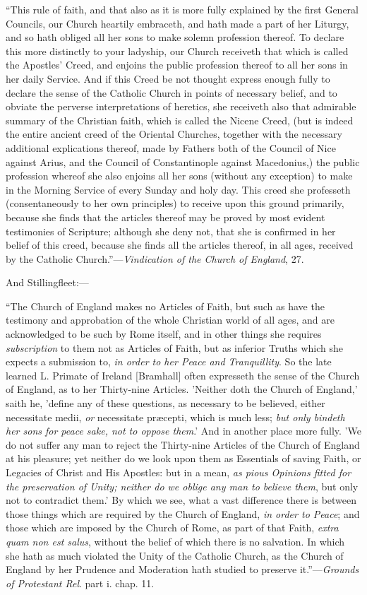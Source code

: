 ``This
rule of faith, and that also as it is more fully explained by the
first General Councils, our Church heartily embraceth, and hath made a
part of her Liturgy, and so hath obliged all her sons to make solemn
profession thereof. To declare this more distinctly to your ladyship,
our Church receiveth that which is called the Apostles' Creed, and
enjoins the public profession thereof to all her sons in her daily
Service. And if this Creed be not thought express enough fully to
declare the sense of the Catholic Church in points of necessary
belief, and to obviate the perverse interpretations of heretics, she
receiveth also that admirable summary of the Christian faith, which is
called the Nicene Creed, (but is indeed the entire ancient creed of
the Oriental Churches, together with the necessary additional
explications thereof, made by Fathers both of the Council of Nice
against Arius, and the Council of Constantinople against Macedonius,)
the public profession whereof she also enjoins all her sons (without
any exception) to make in the Morning Service of every Sunday and holy
day. This creed she professeth (consentaneously
to her own principles) to receive upon this ground primarily, because
she finds that the articles thereof may be proved by most evident
testimonies of Scripture; although she deny not, that she is confirmed
in her belief of this creed, because she finds all the articles
thereof, in all ages, received by the Catholic Church.''—\emph{Vindication
of the Church of England}, 27.

And Stillingfleet:—

``The
Church of England makes no Articles of Faith, but such as have the
testimony and approbation of the whole Christian world of all ages,
and are acknowledged to be such by Rome itself, and in other things
she requires \emph{subscription} to them not as Articles of Faith, but
as inferior Truths which she expects a submission to, \emph{in order to
her Peace and Tranquillity}. So the late learned L. Primate of
Ireland [Bramhall] often expresseth the sense of the Church of
England, as to her Thirty-nine Articles. 'Neither doth the Church of
England,' saith he, 'define any of these questions, as necessary to be
believed, either necessitate medii, \emph{or} necessitate præcepti,
which is much less; \emph{but only bindeth her sons for peace sake, not
to oppose them}.' And in another place more fully. 'We do not
suffer any man to reject the Thirty-nine Articles of the Church of
England at his pleasure; yet neither do we look upon them as
Essentials of saving Faith, or Legacies of Christ and His Apostles:
but in a mean, \emph{as pious Opinions fitted for the preservation of
Unity; neither do we oblige any man to believe them}, but only not
to contradict them.' By which we see, what a vast difference there is
between those things which are required by the Church of England, \emph{in
order to Peace}; and those which are imposed by the Church of Rome,
as part of that Faith, \emph{extra quam non est salus}, without the
belief of which there is no salvation. In which she hath as much
violated the Unity of the Catholic Church, as the Church of England by
her Prudence and Moderation hath studied to preserve it.''—\emph{Grounds
of Protestant Rel}. part i. chap. 11.

